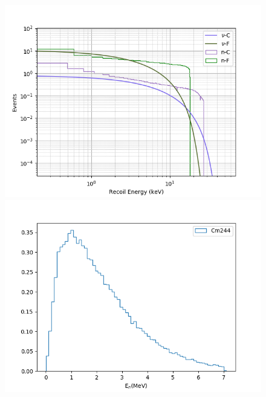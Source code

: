 \documentclass[%
12pt,
twoside,
reprint,
amsmath,amssymb,
aps,
]{article}
\begin{document}
	\begin{figure}[!t]
		\begin{minipage}{0.5\textwidth}
			\centering
			\includegraphics[width=1.1\linewidth]{Images/recoil_combined_normed.png}
		\end{minipage}
		\begin{minipage}{0.5\textwidth}
			\centering
			\includegraphics[width=1.1\linewidth]{Images/cm244_spectrum.png}
		\end{minipage}
		\caption{\label{tab:table-name}}
	\end{figure}
\end{document}
